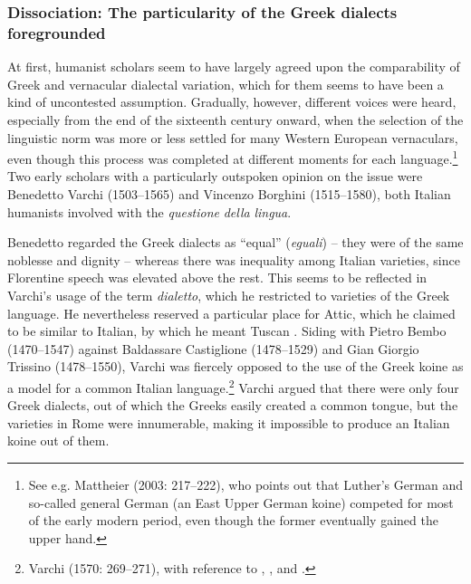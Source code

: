 \subsubsection{Dissociation: The particularity of the Greek dialects foregrounded}
\hypertarget{Toc19704861}{}
At first, humanist scholars seem to have largely agreed upon the comparability of Greek and vernacular dialectal variation, which for them seems to have been a kind of uncontested assumption. Gradually, however, different voices were heard, especially from the end of the sixteenth century onward, when the selection of the linguistic norm was more or less settled for many Western European vernaculars, even though this process was completed at different moments for each language.\footnote{See e.g. Mattheier (2003: 217–222), who points out that Luther’s German and so-called general German (an East Upper German koine) competed for most of the early modern period, even though the former eventually gained the upper hand.} Two early scholars with a particularly outspoken opinion on the issue were Benedetto Varchi (1503–1565) and Vincenzo Borghini (1515–1580), both Italian humanists involved with the \textit{questione} \textit{della} \textit{lingua}.

Benedetto \citet[95]{Varchi1570} regarded the Greek dialects as “equal” (\textit{eguali}) – they were of the same noblesse and dignity – whereas there was inequality among Italian varieties, since Florentine speech was elevated above the rest. This seems to be reflected in Varchi’s usage of the term \textit{dialetto}, which he restricted to varieties of the Greek language. He nevertheless reserved a particular place for Attic, which he claimed to be similar to Italian, by which he meant Tuscan \citep[141]{Varchi1570}. Siding with Pietro Bembo (1470–1547) against Baldassare Castiglione (1478–1529) and Gian Giorgio Trissino (1478–1550), Varchi was fiercely opposed to the use of the Greek koine as a model for a common Italian language.\footnote{Varchi (1570: 269–271), with reference to \citet{Bembo1525}, \citet{Castiglione1528}, and \citet{Trissino1529}.} Varchi argued that there were only four Greek dialects, out of which the Greeks easily created a common tongue, but the varieties in Rome were innumerable, making it impossible to produce an Italian koine out of them.

